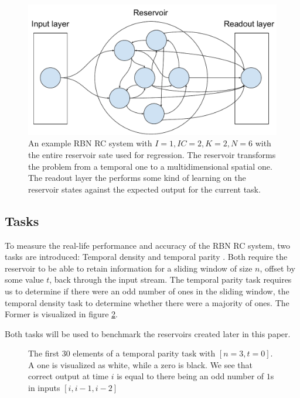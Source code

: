 \begin{figure}
  \centering
  \includegraphics[width=\columnwidth]{background/RBN-Reservoir.pdf}
    \caption[An example RBN RC system]{
    An example RBN RC system with $I=1, IC=2, K=2, N=6$ with the entire reservoir sate used for regression.
    The reservoir transforms the problem from a temporal one to a multidimensional spatial one.
    The readout layer the performs some kind of learning on the reservoir states against the expected output for the current task.}
  \label{figure:rbn-reservoir}
\end{figure}

\subsection{Tasks}
\label{section:tasks}

To measure the real-life performance and accuracy of the RBN RC system,
two tasks are introduced: Temporal density and temporal parity \cite{rbn-reservoir}.
Both require the reservoir to be able to retain information for a sliding window of size $ n $,
offset by some value $ t $, back through the input stream.
The temporal parity task requires us to determine if there were an odd number of ones in the sliding window,
the temporal density task to determine whether there were a majority of ones.
The Former is visualized in figure \ref{figure:temporal-parity}.

Both tasks will be used to benchmark the reservoirs created later in this paper.

\begin{figure}


  \caption[The first elements of the temporal parity task]{
    The first 30 elements of a temporal parity task with $[n=3, t=0]$.
    A one is visualized as white, while a zero is black.
    We see that correct output at time $i$ is equal to there being an odd number of $1$s in inputs $[i, i-1, i-2]$
  }
  \label{figure:temporal-parity}
\end{figure}


